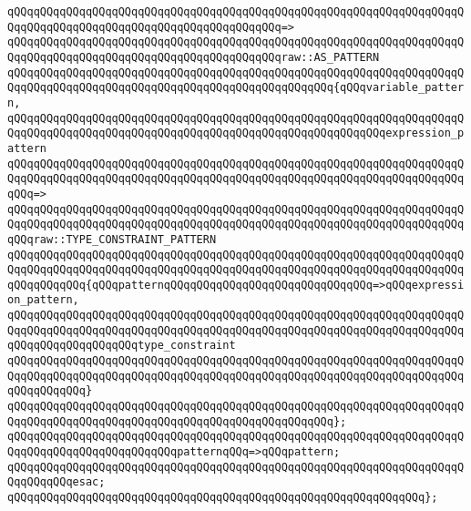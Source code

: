 \verb|qQQqqQQqqQQqqQQqqQQqqQQqqQQqqQQqqQQqqQQqqQQqqQQqqQQqqQQqqQQqqQQqqQQqqQQqqQQqqQQqqQQqqQQqqQQqqQQqqQQqqQQqqQQqqQQq=>|\newline
\verb|qQQqqQQqqQQqqQQqqQQqqQQqqQQqqQQqqQQqqQQqqQQqqQQqqQQqqQQqqQQqqQQqqQQqqQQqqQQqqQQqqQQqqQQqqQQqqQQqqQQqqQQqqQQqqQQqraw::AS_PATTERN|\newline
\verb|qQQqqQQqqQQqqQQqqQQqqQQqqQQqqQQqqQQqqQQqqQQqqQQqqQQqqQQqqQQqqQQqqQQqqQQqqQQqqQQqqQQqqQQqqQQqqQQqqQQqqQQqqQQqqQQqqQQqqQQq{qQQqvariable_pattern,|\newline
\verb|qQQqqQQqqQQqqQQqqQQqqQQqqQQqqQQqqQQqqQQqqQQqqQQqqQQqqQQqqQQqqQQqqQQqqQQqqQQqqQQqqQQqqQQqqQQqqQQqqQQqqQQqqQQqqQQqqQQqqQQqqQQqqQQqexpression_pattern|\newline
\verb|qQQqqQQqqQQqqQQqqQQqqQQqqQQqqQQqqQQqqQQqqQQqqQQqqQQqqQQqqQQqqQQqqQQqqQQqqQQqqQQqqQQqqQQqqQQqqQQqqQQqqQQqqQQqqQQqqQQqqQQqqQQqqQQqqQQqqQQqqQQqqQQq=>|\newline
\verb|qQQqqQQqqQQqqQQqqQQqqQQqqQQqqQQqqQQqqQQqqQQqqQQqqQQqqQQqqQQqqQQqqQQqqQQqqQQqqQQqqQQqqQQqqQQqqQQqqQQqqQQqqQQqqQQqqQQqqQQqqQQqqQQqqQQqqQQqqQQqqQQqraw::TYPE_CONSTRAINT_PATTERN|\newline
\verb|qQQqqQQqqQQqqQQqqQQqqQQqqQQqqQQqqQQqqQQqqQQqqQQqqQQqqQQqqQQqqQQqqQQqqQQqqQQqqQQqqQQqqQQqqQQqqQQqqQQqqQQqqQQqqQQqqQQqqQQqqQQqqQQqqQQqqQQqqQQqqQQqqQQqqQQq{qQQqpatternqQQqqQQqqQQqqQQqqQQqqQQqqQQqqQQq=>qQQqexpression_pattern,|\newline
\verb|qQQqqQQqqQQqqQQqqQQqqQQqqQQqqQQqqQQqqQQqqQQqqQQqqQQqqQQqqQQqqQQqqQQqqQQqqQQqqQQqqQQqqQQqqQQqqQQqqQQqqQQqqQQqqQQqqQQqqQQqqQQqqQQqqQQqqQQqqQQqqQQqqQQqqQQqqQQqqQQqtype_constraint|\newline
\verb|qQQqqQQqqQQqqQQqqQQqqQQqqQQqqQQqqQQqqQQqqQQqqQQqqQQqqQQqqQQqqQQqqQQqqQQqqQQqqQQqqQQqqQQqqQQqqQQqqQQqqQQqqQQqqQQqqQQqqQQqqQQqqQQqqQQqqQQqqQQqqQQqqQQqqQQq}|\newline
\verb|qQQqqQQqqQQqqQQqqQQqqQQqqQQqqQQqqQQqqQQqqQQqqQQqqQQqqQQqqQQqqQQqqQQqqQQqqQQqqQQqqQQqqQQqqQQqqQQqqQQqqQQqqQQqqQQqqQQqqQQq};|\newline
\newline
\verb|qQQqqQQqqQQqqQQqqQQqqQQqqQQqqQQqqQQqqQQqqQQqqQQqqQQqqQQqqQQqqQQqqQQqqQQqqQQqqQQqqQQqqQQqqQQqqQQqpatternqQQq=>qQQqpattern;|\newline
\verb|qQQqqQQqqQQqqQQqqQQqqQQqqQQqqQQqqQQqqQQqqQQqqQQqqQQqqQQqqQQqqQQqqQQqqQQqqQQqqQQqesac;|\newline
\verb|qQQqqQQqqQQqqQQqqQQqqQQqqQQqqQQqqQQqqQQqqQQqqQQqqQQqqQQqqQQqqQQq};|\newline
\newline
